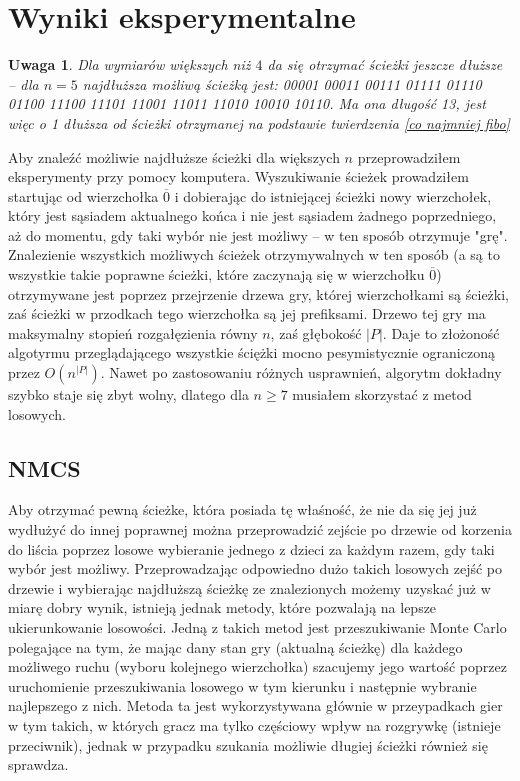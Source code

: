\documentclass{pracamgr}
\newtheorem{remark}[theorem]{Uwaga}
\begin{document}
   \section{Wyniki eksperymentalne}
    \begin{remark}\label{da sie dluzsze}
     Dla wymiarów większych niż $4$ da się otrzymać ścieżki jeszcze dłuższe -- dla $n=5$ najdłuższa możliwą ścieżką jest:
     00001
     00011
     00111
     01111
     01110
     01100
     11100
     11101
     11001
     11011
     11010
     10010
     10110.\newline
     Ma ona długość 13, jest więc o 1 dłuższa od ścieżki otrzymanej na podstawie twierdzenia \ref{co najmniej fibo}
    \end{remark}
    Aby znaleźć możliwie najdłuższe ścieżki dla większych $n$ przeprowadziłem eksperymenty przy pomocy komputera.
    Wyszukiwanie ścieżek prowadziłem startując od wierzchołka $\overline{0}$ i dobierając do istniejącej ścieżki nowy wierzchołek,
    który jest sąsiadem aktualnego końca i nie jest sąsiadem żadnego poprzedniego, aż do momentu, gdy taki wybór nie jest możliwy 
    -- w ten sposób otrzymuje "grę". Znalezienie wszystkich możliwych ścieżek otrzymywalnych w ten sposób
    (a są to wszystkie takie poprawne ścieżki, które zaczynają się w wierzchołku $\overline{0}$) otrzymywane jest poprzez przejrzenie
    drzewa gry, której wierzchołkami są ścieżki, zaś ścieżki w przodkach tego wierzchołka są jej prefiksami.
    Drzewo tej gry ma maksymalny stopień rozgałęzienia równy $n$, zaś głębokość $|P|$.\newline
    Daje to złożoność algotyrmu przeglądającego wszystkie ściężki mocno pesymistycznie ograniczoną przez $O(n^{|P|})$. Nawet po zastosowaniu
    różnych usprawnień, algorytm dokładny szybko staje się zbyt wolny, dlatego dla $n\ge7$ musiałem skorzystać z metod losowych.
    \subsection{NMCS}
     Aby otrzymać pewną ścieżke, która posiada tę właśność, że nie da się jej już wydłużyć do innej poprawnej można przeprowadzić zejście po drzewie
     od korzenia do liścia poprzez losowe wybieranie jednego z dzieci za każdym razem, gdy taki wybór jest możliwy.\newline
     Przeprowadzając odpowiedno dużo takich losowych zejść po drzewie i wybierając najdłuższą ścieżkę ze znalezionych możemy uzyskać już w miarę dobry
     wynik, istnieją jednak metody, które pozwalają na lepsze ukierunkowanie losowości.\newline
     Jedną z takich metod jest przeszukiwanie Monte Carlo polegające na tym, że mając dany stan gry (aktualną ścieżkę) dla każdego możliwego ruchu
     (wyboru kolejnego wierzchołka) szacujemy jego wartość poprzez uruchomienie przeszukiwania losowego w tym kierunku i następnie wybranie najlepszego z nich.
     Metoda ta jest wykorzystywana głównie w przeypadkach gier w tym takich, w których gracz ma tylko częściowy wpływ na rozgrywkę (istnieje przeciwnik),
     jednak w przypadku szukania możliwie długiej ścieżki również się sprawdza.
     
\end{document}
